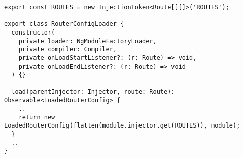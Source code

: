 \begin{verbatim}
export const ROUTES = new InjectionToken<Route[][]>('ROUTES');

export class RouterConfigLoader {
  constructor(
    private loader: NgModuleFactoryLoader,
    private compiler: Compiler,
    private onLoadStartListener?: (r: Route) => void,
    private onLoadEndListener?: (r: Route) => void
  ) {}

  load(parentInjector: Injector, route: Route): Observable<LoadedRouterConfig> {
    ..
    return new LoadedRouterConfig(flatten(module.injector.get(ROUTES)), module);
  }
  ..
}
\end{verbatim}
